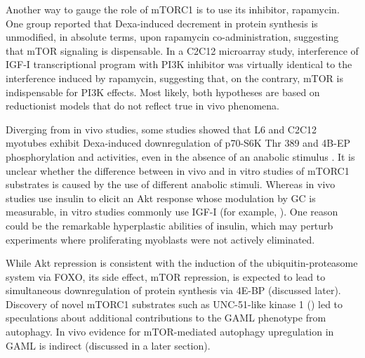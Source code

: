 \documentclass[12pt,english]{report}\usepackage[]{graphicx}\usepackage[]{color}
\begin{document}
Another way to gauge the role of mTORC1 is to use its inhibitor, rapamycin.
One group reported that Dexa-induced decrement in protein synthesis
is unmodified, in absolute terms, upon rapamycin co-administration\citep{dardevet1999glucocorticoid-induced},
suggesting that mTOR signaling is dispensable. In a C2C12 microarray
study, interference of IGF-I transcriptional program with PI3K inhibitor
was virtually identical to the interference induced by rapamycin\citep{latres2005insulin-like},
suggesting that, on the contrary, mTOR is indispensable for PI3K effects.
Most likely, both hypotheses are based on reductionist models that
do not reflect true in vivo phenomena.

Diverging from in vivo studies, some studies showed that L6 and C2C12
myotubes exhibit Dexa-induced downregulation of p70-S6K Thr 389 and
4B-EP phosphorylation and activities, even in the absence of an anabolic
stimulus \citep{frost2009regulation,wu2010redd1,shah2000glucocorticoidsa}.
It is unclear whether the difference between in vivo and in vitro
studies of mTORC1 substrates is caused by the use of different anabolic
stimuli. Whereas in vivo studies use insulin to elicit an Akt response
whose modulation by GC is measurable, in vitro studies commonly use
IGF-I (for example, \citep{stitt2004igf-1/pi3k/akt}). One reason
could be the remarkable hyperplastic abilities of insulin\citep{conejo2001insulina},
which may perturb experiments where proliferating myoblasts were not
actively eliminated.

While Akt repression is consistent with the induction of the ubiquitin-proteasome
system via FOXO, its side effect, mTOR repression, is expected to
lead to simultaneous downregulation of protein synthesis via 4E-BP
(discussed later). Discovery of novel mTORC1 substrates such as UNC-51-like
kinase 1 ()\citep{hosokawa2009nutrient-dependent}
led to speculations about additional contributions to the GAML phenotype
from autophagy. In vivo evidence for mTOR-mediated autophagy upregulation
in GAML is indirect (discussed in a later section).
\end{document}
